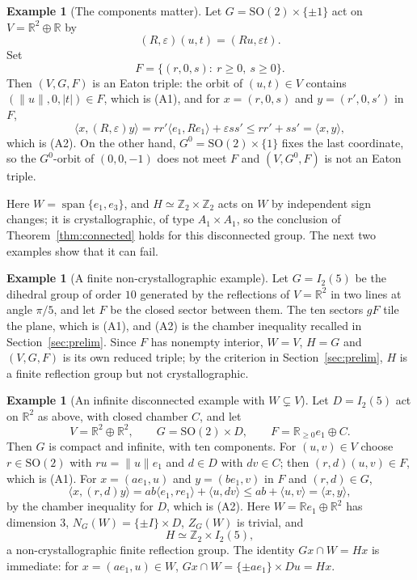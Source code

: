 \documentclass[11pt]{amsart}
\theoremstyle{plain}
\theoremstyle{definition}
\newtheorem{example}[theorem]{Example}
\theoremstyle{remark}
\newcommand{\R}{\mathbb R}
\newcommand{\Z}{\mathbb Z}
\newcommand{\ip}[2]{\langle #1,#2\rangle}
\newcommand{\spn}{\operatorname{span}}
\begin{document}
\begin{example}[The components matter]\label{ex:swap}
Let $G=\mathrm{SO}(2)\times\{\pm1\}$ act on $V=\R^2\oplus\R$ by
\[
(R,\varepsilon)(u,t)=(Ru,\varepsilon t).
\]
Set
\[
F=\{(r,0,s):\ r\ge0,\ s\ge0\}.
\]
Then $(V,G,F)$ is an Eaton triple: the orbit of $(u,t)\in V$ contains $(\|u\|,0,|t|)\in F$, which is (A1), and for $x=(r,0,s)$ and $y=(r',0,s')$ in $F$,
\[
\ip{x}{(R,\varepsilon)y}=rr'\ip{e_1}{Re_1}+\varepsilon ss'
\le rr'+ss'=\ip{x}{y},
\]
which is (A2). On the other hand, $G^0=\mathrm{SO}(2)\times\{1\}$ fixes the last coordinate, so the $G^0$-orbit of $(0,0,-1)$ does not meet $F$ and $(V,G^0,F)$ is not an Eaton triple.

Here $W=\spn\{e_1,e_3\}$, and $H\simeq\Z_2\times\Z_2$ acts on $W$ by independent sign changes; it is crystallographic, of type $A_1\times A_1$, so the conclusion of Theorem~\ref{thm:connected} holds for this disconnected group. The next two examples show that it can fail.
\end{example}

\begin{example}[A finite non-crystallographic example]\label{ex:I25}
Let $G=I_2(5)$ be the dihedral group of order $10$ generated by the reflections of $V=\R^2$ in two lines at angle $\pi/5$, and let $F$ be the closed sector between them. The ten sectors $gF$ tile the plane, which is (A1), and (A2) is the chamber inequality recalled in Section~\ref{sec:prelim}. Since $F$ has nonempty interior, $W=V$, $H=G$ and $(V,G,F)$ is its own reduced triple; by the criterion in Section~\ref{sec:prelim}, $H$ is a finite reflection group but not crystallographic.
\end{example}

\begin{example}[An infinite disconnected example with $W\subsetneq V$]\label{ex:SO2I25}
Let $D=I_2(5)$ act on $\R^2$ as above, with closed chamber $C$, and let
\[
V=\R^2\oplus\R^2,\qquad G=\mathrm{SO}(2)\times D,\qquad F=\R_{\ge0}e_1\oplus C .
\]
Then $G$ is compact and infinite, with ten components. For $(u,v)\in V$ choose $r\in \mathrm{SO}(2)$ with $ru=\|u\|e_1$ and $d\in D$ with $dv\in C$; then $(r,d)(u,v)\in F$, which is (A1). For $x=(ae_1,u)$ and $y=(be_1,v)$ in $F$ and $(r,d)\in G$,
\[
\ip{x}{(r,d)y}=ab\ip{e_1}{re_1}+\ip{u}{dv}\le ab+\ip{u}{v}=\ip{x}{y},
\]
by the chamber inequality for $D$, which is (A2). Here $W=\R e_1\oplus\R^2$ has dimension $3$, $N_G(W)=\{\pm I\}\times D$, $Z_G(W)$ is trivial, and
\[
H\simeq\Z_2\times I_2(5),
\]
a non-crystallographic finite reflection group. The identity $Gx\cap W=Hx$ is immediate: for $x=(ae_1,u)\in W$, $Gx\cap W=\{\pm ae_1\}\times Du=Hx$.
\end{example}
\end{document}
